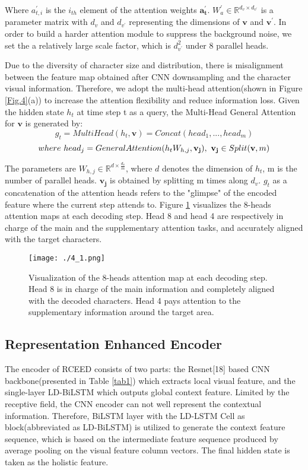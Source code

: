 \documentclass[runningheads]{llncs}
\begin{document}
Where $a_{t,i}^{'}$ is the $i_{th}$ element of the attention weights $\mathbf{a_{t}^{'}}$. $W_{a}^{'}\in \mathbb{R}^{d_{v}\times d_{v^{'}}}$ is a parameter matrix with $d_{v}$ and $d_{v^{'}}$ representing the dimensions of $\mathbf{v}$ and $\mathbf{v^{'}}$. In order to build a harder attention module to suppress the background noise, we set the a relatively large scale factor, which is  $d_{v^{'}}^{2}$ under 8 parallel heads.

Due to the diversity of character size and distribution, there is misalignment between the feature map obtained after CNN downsampling and the character visual information. Therefore, we adopt the multi-head attention(shown in Figure \ref{Fig.4}(a)) to increase the attention flexibility and reduce information loss. Given the hidden state $h_{t}$ at time step t as a query, the Multi-Head General Attention for $\mathbf{v}$ is generated by:
\begin{equation}
    g_{t}=MultiHead(h_{t}, \mathbf{v}) = Concat(head_{1},...,head_{m}) 
\end{equation}
\begin{equation}
where \ head_{j} = GeneralAttention(h_{t}W_{h,j}, \mathbf{v_{j}}), \ \mathbf{v_{j}} \in Split(\mathbf{v}, m) \notag
\end{equation}

The parameters are $W_{h,j} \in  \mathbb{R}^{d\times \frac{d_{v}}{m}}$, where $d$ denotes the dimension of $h_{t}$, m is the number of parallel heads. $\mathbf{v_{j}}$ is obtained by splitting m times along $d_{v}$. $g_{t}$ as a concatenation of the attention heads refers to the "glimpse" of the encoded feature where the current step attends to. Figure \ref{Fig.2} visualizes the 8-heads attention maps at each decoding step. Head 8 and head 4 are respectively in charge of the main and the supplementary attention tasks, and accurately aligned with the target characters.
\begin{figure}
\centering
\texttt{[image: ./4\_1.png]}
\caption{Visualization of the 8-heads attention map at each decoding step. Head 8 is in charge of the main information and completely aligned with the decoded characters. Head 4 pays attention to the supplementary information around the target area.} 
\label{Fig.2}
\end{figure}

\subsection{Representation Enhanced Encoder}
The encoder of RCEED consists of two parts: the Resnet[18] based CNN backbone(presented in Table \ref{tab1}) which extracts local visual feature, and the single-layer LD-BiLSTM which outputs global context feature. Limited by the receptive field, the CNN encoder can not well represent the contextual information. Therefore, BiLSTM\cite{hochreiter1997long} layer with the LD-LSTM Cell as block(abbreviated as LD-BiLSTM) is utilized to generate the context feature sequence, which is based on the intermediate feature sequence produced by average pooling on the visual feature column vectors. The final hidden state is taken as the holistic feature.
\end{document}
